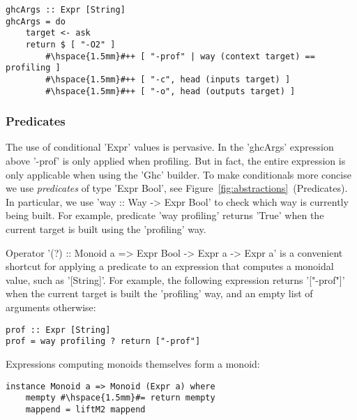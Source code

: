 \begin{lstlisting}
ghcArgs :: Expr [String]
ghcArgs = do
    target <- ask
    return $ [ "-O2" ]
        #\hspace{1.5mm}#++ [ "-prof" | way (context target) == profiling ]
        #\hspace{1.5mm}#++ [ "-c", head (inputs target) ]
        #\hspace{1.5mm}#++ [ "-o", head (outputs target) ]
\end{lstlisting}

\subsubsection{Predicates}

The use of conditional \lst'Expr' values is pervasive. In the \lst'ghcArgs' expression
above \lst'-prof' is only applied when profiling. But in fact, the entire expression
is only applicable when using the \lst'Ghc' builder. To make conditionals more concise
we use \emph{predicates} of type \lst'Expr Bool', see
Figure~\ref{fig:abstractions}~(Predicates). In particular, we
use \lst'way :: Way -> Expr Bool' to check which way is currently being built.
For example, predicate \lst'way profiling' returns \lst'True' when the
current target is built using the \lst'profiling' way.

Operator \lst'(?) :: Monoid a => Expr Bool -> Expr a -> Expr a' is a
convenient shortcut for applying a predicate to an expression that computes a monoidal value, such
as \lst'[String]'. For example, the following expression returns
\lst'["-prof"]' when the current target is built the \lst'profiling' way, and an
empty list of arguments otherwise:

\begin{lstlisting}
prof :: Expr [String]
prof = way profiling ? return ["-prof"]
\end{lstlisting}

\noindent Expressions computing monoids themselves form a monoid:

\begin{lstlisting}
instance Monoid a => Monoid (Expr a) where
    mempty #\hspace{1.5mm}#= return mempty
    mappend = liftM2 mappend
\end{lstlisting}

